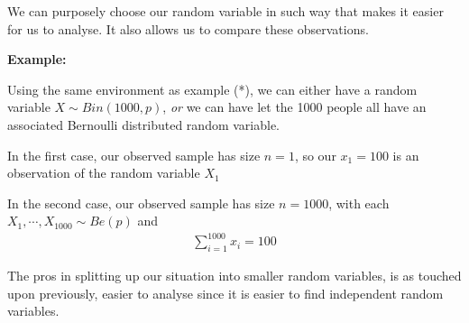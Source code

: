 \par\bigskip
\noindent We can purposely choose our random variable in such way that makes it easier for us to analyse. It also allows us to compare these observations.
\par\bigskip
\noindent\textbf{Example:}\par
\noindent Using the same environment as example (*), we can either have a random variable $X\sim Bin(1000,p)$, \textit{or} we can have let the 1000 people all have an associated Bernoulli distributed random variable.\par
\noindent In the first case, our observed sample has size $n=1$, so our $x_1=100$ is an observation of the random variable $X_1$\par
\noindent In the second case, our observed sample has size $n=1000$, with each $X_1,\cdots,X_{1000}\sim Be(p)$ and 
\begin{equation*}
  \begin{gathered}
    \sum_{i=1}^{1000}x_i=100
  \end{gathered}
\end{equation*}
\par\bigskip
\noindent The pros in splitting up our situation into smaller random variables, is as touched upon previously, easier to analyse since it is easier to find independent random variables.
\par\bigskip
